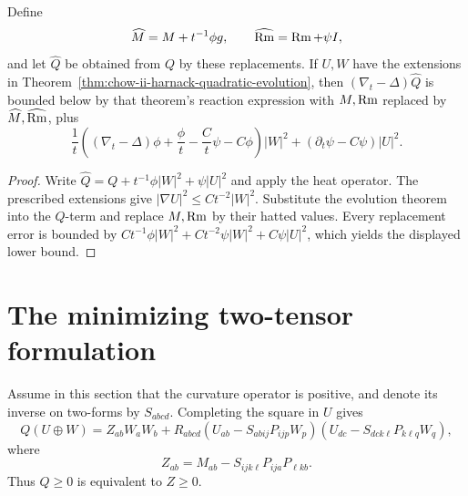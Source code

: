 \begin{lemma}
\label{lem:chow-ii-perturbed-harnack-evolution}
Define
\[
\widehat{M}=M+t^{-1}\phi g,\qquad \widehat{\operatorname{Rm}}=\operatorname{Rm}+\psi I,
\]
and let \(\widehat Q\) be obtained from \(Q\) by these replacements.  If
\(U,W\) have the extensions in
Theorem~\ref{thm:chow-ii-harnack-quadratic-evolution}, then
\((\nabla_t-\Delta)\widehat Q\) is bounded below by that theorem's reaction
expression with \(M,\operatorname{Rm}\) replaced by \(\widehat{M},\widehat{\operatorname{Rm}}\), plus
\[
\frac1t\left((\nabla_t-\Delta)\phi+\frac\phi t-\frac C t\psi-C\phi\right)|W|^2
+(\partial_t\psi-C\psi)|U|^2.
\]
\end{lemma}
\begin{proof}
Write \(\widehat Q=Q+t^{-1}\phi|W|^2+\psi|U|^2\) and apply the heat
operator.  The prescribed extensions give
\(|\nabla U|^2\le Ct^{-2}|W|^2\).  Substitute the evolution theorem into the
\(Q\)-term and replace \(M,\operatorname{Rm}\) by their hatted values.  Every replacement
error is bounded by \(Ct^{-1}\phi|W|^2+Ct^{-2}\psi|W|^2+C\psi|U|^2\),
which yields the displayed lower bound.
\end{proof}

\section{The minimizing two-tensor formulation}

Assume in this section that the curvature operator is positive, and denote its
inverse on two-forms by \(S_{abcd}\).  Completing the square in \(U\) gives
\[
Q(U\oplus W)=Z_{ab}W_aW_b
+R_{abcd}(U_{ab}-S_{abij}P_{ijp}W_p)
 (U_{dc}-S_{dck\ell}P_{k\ell q}W_q),
\]
where
\[
Z_{ab}=M_{ab}-S_{ijk\ell}P_{ija}P_{\ell kb}.
\]
Thus \(Q\ge0\) is equivalent to \(Z\ge0\).

